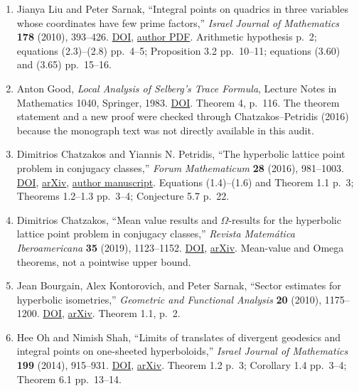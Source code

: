 \begin{enumerate}
  Alex Eskin and Curtis McMullen, ``Mixing, counting, and equidistribution in Lie groups,'' \emph{Duke Mathematical Journal} \textbf{71} (1993), 181--209. \href{https://doi.org/10.1215/S0012-7094-93-07108-6}{DOI}, \href{https://people.math.harvard.edu/~ctm/papers/home/text/papers/mixing/mixing.pdf}{author PDF}. Theorem 1.4, author PDF p.~3; Theorems 6.1 and 6.4 pp.~30--31; Open Question 1 p.~35.
\item
  Jianya Liu and Peter Sarnak, ``Integral points on quadrics in three variables whose coordinates have few prime factors,'' \emph{Israel Journal of Mathematics} \textbf{178} (2010), 393--426. \href{https://doi.org/10.1007/s11856-010-0069-y}{DOI}, \href{https://web.math.princeton.edu/facultypapers/sarnak/few-final.pdf}{author PDF}. Arithmetic hypothesis p.~2; equations (2.3)--(2.8) pp.~4--5; Proposition 3.2 pp.~10--11; equations (3.60) and (3.65) pp.~15--16.
\item
  Anton Good, \emph{Local Analysis of Selberg's Trace Formula}, Lecture Notes in Mathematics 1040, Springer, 1983. \href{https://doi.org/10.1007/BFb0073074}{DOI}. Theorem 4, p.~116. The theorem statement and a new proof were checked through Chatzakos--Petridis (2016) because the monograph text was not directly available in this audit.
\item
  Dimitrios Chatzakos and Yiannis N. Petridis, ``The hyperbolic lattice point problem in conjugacy classes,'' \emph{Forum Mathematicum} \textbf{28} (2016), 981--1003. \href{https://doi.org/10.1515/forum-2015-0102}{DOI}, \href{https://arxiv.org/abs/1504.01307}{arXiv}, \href{https://discovery.ucl.ac.uk/1477487/7/Petridis_forum-2015-0102.pdf}{author manuscript}. Equations (1.4)--(1.6) and Theorem 1.1 p.~3; Theorems 1.2--1.3 pp.~3--4; Conjecture 5.7 p.~22.
\item
  Dimitrios Chatzakos, ``Mean value results and \(\Omega\)-results for the hyperbolic lattice point problem in conjugacy classes,'' \emph{Revista Matemática Iberoamericana} \textbf{35} (2019), 1123--1152. \href{https://doi.org/10.4171/RMI/1080}{DOI}, \href{https://arxiv.org/abs/1610.01462}{arXiv}. Mean-value and Omega theorems, not a pointwise upper bound.
\item
  Jean Bourgain, Alex Kontorovich, and Peter Sarnak, ``Sector estimates for hyperbolic isometries,'' \emph{Geometric and Functional Analysis} \textbf{20} (2010), 1175--1200. \href{https://doi.org/10.1007/s00039-010-0092-5}{DOI}, \href{https://arxiv.org/abs/1001.4541}{arXiv}. Theorem 1.1, p.~2.
\item
  Hee Oh and Nimish Shah, ``Limits of translates of divergent geodesics and integral points on one-sheeted hyperboloids,'' \emph{Israel Journal of Mathematics} \textbf{199} (2014), 915--931. \href{https://doi.org/10.1007/s11856-013-0063-2}{DOI}, \href{https://arxiv.org/abs/1104.4988}{arXiv}. Theorem 1.2 p.~3; Corollary 1.4 pp.~3--4; Theorem 6.1 pp.~13--14.

\end{enumerate}
